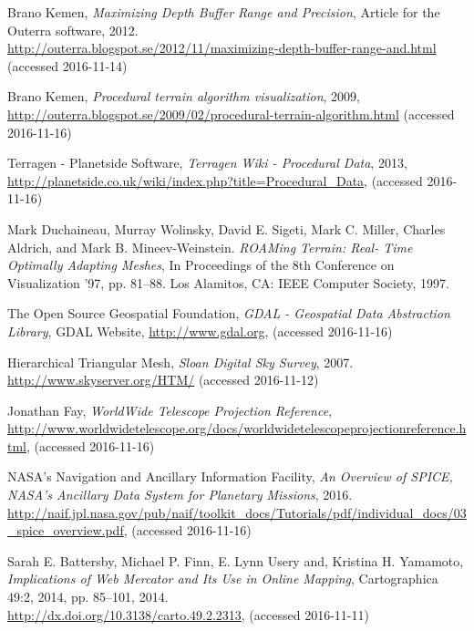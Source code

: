 \begin{thebibliography}{99}
  Brano Kemen,
  \emph{Maximizing Depth Buffer Range and Precision},
  Article for the Outerra software,
  2012. \\
  \url{http://outerra.blogspot.se/2012/11/maximizing-depth-buffer-range-and.html}
  (accessed 2016-11-14)

  Brano Kemen,
  \emph{Procedural terrain algorithm visualization},
  2009, \\
  \url{http://outerra.blogspot.se/2009/02/procedural-terrain-algorithm.html}
  (accessed 2016-11-16)

  Terragen - Planetside Software,
  \emph{Terragen Wiki - Procedural Data},
  2013, \\
  \url{http://planetside.co.uk/wiki/index.php?title=Procedural_Data},
  (accessed 2016-11-16)

  Mark Duchaineau, Murray Wolinsky, David E. Sigeti, Mark C. Miller, Charles Aldrich, and Mark B. Mineev-Weinstein.
  \emph{ROAMing Terrain: Real- Time Optimally Adapting Meshes},
  In Proceedings of the 8th Conference on Visualization ’97, pp. 81–88. Los Alamitos, CA: IEEE Computer Society, 1997.
  \url{}

  The Open Source Geospatial Foundation,
  \emph{GDAL - Geospatial Data Abstraction Library},
  GDAL Website,
  \url{http://www.gdal.org},
  (accessed 2016-11-16)

  Hierarchical Triangular Mesh,
  \emph{Sloan Digital Sky Survey},
  2007. \\
  \url{http://www.skyserver.org/HTM/}
  (accessed 2016-11-12)
  
  Jonathan Fay,
  \emph{WorldWide Telescope Projection Reference},
  \url{http://www.worldwidetelescope.org/docs/worldwidetelescopeprojectionreference.html},
  (accessed 2016-11-16)

  NASA's Navigation and Ancillary Information Facility,
  \emph{An Overview of SPICE, NASA’s Ancillary Data System for Planetary Missions},
  2016. \\
  \url{http://naif.jpl.nasa.gov/pub/naif/toolkit_docs/Tutorials/pdf/individual_docs/03_spice_overview.pdf},
  (accessed 2016-11-16)

  Sarah E. Battersby, Michael P. Finn, E. Lynn Usery and, Kristina H. Yamamoto,
  \emph{Implications of Web Mercator and Its Use in Online Mapping},
  Cartographica 49:2, 2014, pp. 85–101,
  2014. \\
  \url{http://dx.doi.org/10.3138/carto.49.2.2313},
  (accessed 2016-11-11)


\end{thebibliography}
